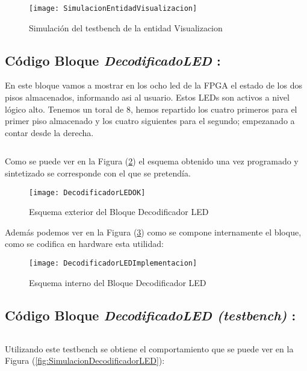     \begin{figure}[H]
		    \centering
		    \texttt{[image: SimulacionEntidadVisualizacion]}
		    \caption{Simulación del testbench de la entidad Visualizacion}
		    \label{fig:SimulacionEntidadVisualizacion}
	\end{figure}

\subsection {Código Bloque \textit{DecodificadoLED} :} \label{code:DecodificadorLED}
	En este bloque vamos a mostrar en los ocho led de la FPGA el estado de los dos pisos almacenados, informando asi al usuario. Estos LEDs son activos a nivel lógico alto. Tenemos un toral de 8, hemos repartido los cuatro primeros para el primer piso almacenado y los cuatro siguientes para el segundo; empezanado a contar desde la derecha.
	\inputminted[frame=lines,fontsize=\footnotesize,linenos]{vhdl}{CodeFiles/DecodificadorLED.vhd}

	Como se puede ver en la Figura (\ref{fig:DecodificadorLEDOK}) el esquema obtenido una vez programado y sintetizado se corresponde con el que se pretendía.
    \begin{figure}[H]
		    \centering
		    \texttt{[image: DecodificadorLEDOK]}
		    \caption{Esquema exterior del Bloque Decodificador LED}
		    \label{fig:DecodificadorLEDOK}
	\end{figure}
    Además podemos ver en la Figura (\ref{fig:DecodificadorLEDImplementacion}) como se compone internamente el bloque, como se codifica en hardware esta utilidad:
    \begin{figure}[H]
		    \centering
		    \texttt{[image: DecodificadorLEDImplementacion]}
		    \caption{Esquema interno del Bloque Decodificador LED}
		    \label{fig:DecodificadorLEDImplementacion}
	\end{figure}
	
\subsection {Código Bloque \textit{DecodificadoLED (testbench)} :} \label{code:DecodificadorLED_tb}
	\inputminted[frame=lines,fontsize=\footnotesize,linenos]{vhdl}{CodeFiles/DecodificadorLED_tb.vhd}

    Utilizando este testbench se obtiene el comportamiento que se puede ver en la Figura (\ref{fig:SimulacionDecodificadorLED}):

